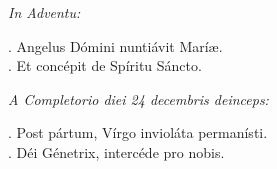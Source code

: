 \emph{In Adventu:}

\VBar. Angelus Dómini nuntiávit Maríæ. \\
\RBar. Et concépit de Spíritu Sáncto.

\emph{A Completorio diei 24 decembris deinceps:}

\VBar. Post pártum, Vírgo invioláta permanísti. \\
\RBar. Déi Génetrix, intercéde pro nobis.
